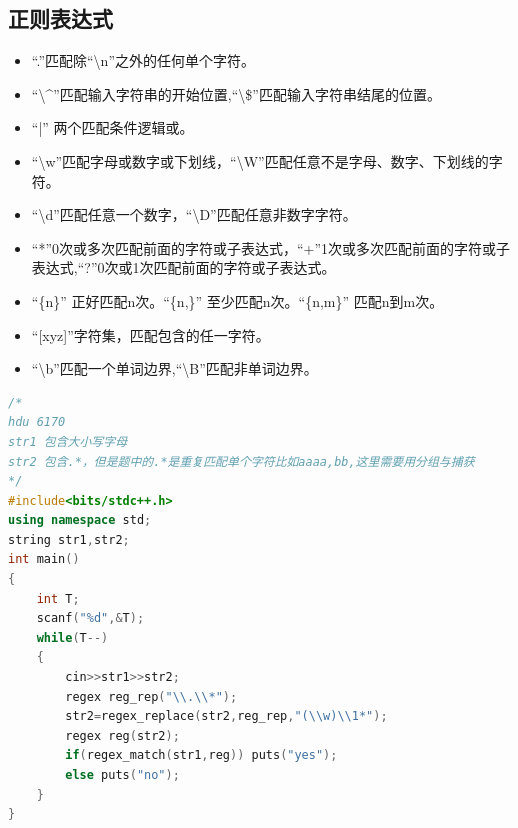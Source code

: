 \documentclass[UTF8,a4paper,titlepage]{ctexart}
\begin{document}
\subsection{正则表达式}
\begin{itemize}
	\item ``.''匹配除``\textbackslash n''之外的任何单个字符。
	\item ``\textbackslash \^\quad ''匹配输入字符串的开始位置,``\textbackslash \$''匹配输入字符串结尾的位置。
	\item ``|'' 两个匹配条件逻辑或。
	\item ``\textbackslash w''匹配字母或数字或下划线，``\textbackslash W''匹配任意不是字母、数字、下划线的字符。
	\item ``\textbackslash d''匹配任意一个数字，``\textbackslash D''匹配任意非数字字符。

	\item ``*''0次或多次匹配前面的字符或子表达式，``+''1次或多次匹配前面的字符或子表达式,``?''0次或1次匹配前面的字符或子表达式。
	\item ``\{n\}'' 正好匹配n次。``\{n,\}'' 至少匹配n次。``\{n,m\}'' 匹配n到m次。
	\item ``[xyz]''字符集，匹配包含的任一字符。
	\item ``\textbackslash b''匹配一个单词边界,``\textbackslash B''匹配非单词边界。
\end{itemize}

\begin{lstlisting}[language=C++]
/*
hdu 6170
str1 包含大小写字母
str2 包含.*，但是题中的.*是重复匹配单个字符比如aaaa,bb,这里需要用分组与捕获
*/
#include<bits/stdc++.h>
using namespace std;
string str1,str2;
int main()
{
    int T;
    scanf("%d",&T);
    while(T--)
    {
        cin>>str1>>str2;
        regex reg_rep("\\.\\*");
        str2=regex_replace(str2,reg_rep,"(\\w)\\1*");
        regex reg(str2);
        if(regex_match(str1,reg)) puts("yes");
        else puts("no");
    }
}

\end{lstlisting}
\end{document}
